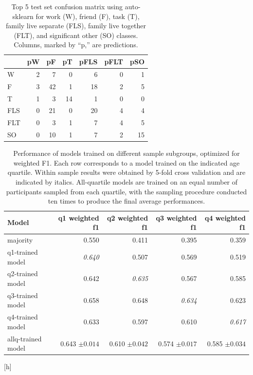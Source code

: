 \documentclass[acmlarge]{acmart}
\begin{document}
\begin{table}[h]
    \centering
    \begin{tabular}{|lrrrrrr|}
        \hline
        {} &  pW &  pF &  pT &  pFLS &  pFLT &  pSO \\
        \hline
        W   &    2 &    7 &    0 &      6 &      0 &     1 \\
        F   &    3 &   42 &    1 &     18 &      2 &     5 \\
        T   &    1 &    3 &   14 &      1 &      0 &     0 \\
        FLS &    0 &   21 &    0 &     20 &      4 &     4 \\
        FLT &    0 &    3 &    1 &      7 &      4 &     5 \\
        SO  &    0 &   10 &    1 &      7 &      2 &    15 \\
        \hline
        \end{tabular}
        \caption{Top 5 test set confusion matrix using auto-sklearn for work (W), friend (F), task (T), family live separate (FLS), family live together (FLT), and significant other (SO) classes. Columns, marked by ``p,'' are predictions.}
        \label{tab:top5_6class_confusion}
\end{table}

\begin{table}[h]
    \centering
    \begin{tabular}{lrrrr}
    \toprule
    Model &  q1 weighted f1 &  q2 weighted f1 &  q3 weighted f1 &  q4 weighted f1 \\
    \midrule
    majority               &           0.550 &           0.411 &           0.395 &           0.359 \\
    q1-trained model       &           \textit{0.640}   &           0.507 &           0.569 &           0.519 \\
    q2-trained model       &           0.642 &           \textit{0.635}   &           0.567 &           0.585 \\
    q3-trained model       &           0.658 &           0.648 &           \textit{0.634}   &           0.623 \\
    q4-trained model       &           0.633 &           0.597 &           0.610 &           \textit{0.617}   \\
    allq-trained model     &           0.643 $\pm 0.014$ &           0.610 $\pm 0.042$ &           0.574 $\pm 0.017$ &           0.585 $\pm 0.034$ \\
    \bottomrule
    \end{tabular}
    \caption{Performance of models trained on different sample subgroups, optimized for weighted F1. Each row corresponds to a model trained on the indicated age quartile. Within sample results were obtained by 5-fold cross validation and are indicated by italics.  All-quartile models are trained on an equal number of participants sampled from each quartile, with the sampling procedure conducted ten times to produce the final average performances.}
    \label{tab:subpop_perf_weight}
\end{table}[h]
\end{document}
